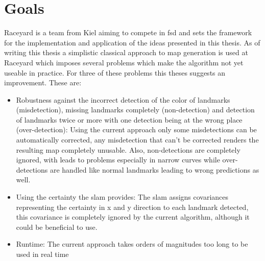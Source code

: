 


\section{Goals}
Raceyard is a team from Kiel aiming to compete in \ac{fsd} and sets the framework for the implementation and application of the ideas presented in this thesis. As of writing this thesis a simplistic classical approach to map generation is used at Raceyard which imposes several problems which make the algorithm not yet useable in practice. For three of these problems this theses suggests an improvement. These are:

\begin{itemize}
    \item Robustness against the incorrect detection of the color of landmarks (misdetection), missing landmarks completely (non-detection) and detection of landmarks twice or more with one detection being at the wrong place (over-detection): Using the current approach only some misdetections can be automatically corrected, any misdetection that can't be corrected renders the resulting map completely unusable. Also, non-detections are completely ignored, with leads to problems especially in narrow curves while over-detections are handled like normal landmarks leading to wrong predictions as well.
    \item Using the certainty the \ac{slam} provides: The \ac{slam} assigns covariances representing the certainty in x and y direction to each landmark detected, this covariance is completely ignored by the current algorithm, although it could be beneficial to use.
    \item Runtime: The current approach takes orders of magnitudes too long to be used in real time
\end{itemize}

